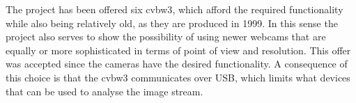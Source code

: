 The project has been offered six \acrfull{cvbw3}\cite{video_blaster}, which afford the required functionality while also being relatively old, as they are produced in 1999. In this sense the project also serves to show the possibility of using newer webcams that are equally or more sophisticated in terms of point of view and resolution. This offer was accepted since the cameras have the desired functionality. A consequence of this choice is that the \gls{cvbw3} communicates over USB, which limits what devices that can be used to analyse the image stream.